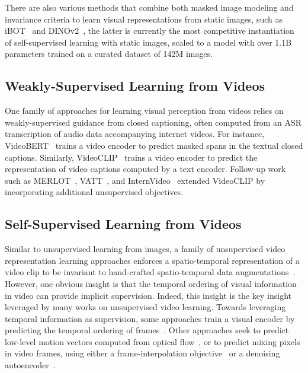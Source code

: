 \documentclass[twocolumn]{fairmeta}
\theoremstyle{plain}
\theoremstyle{definition}
\theoremstyle{remark}
\begin{document}
There are also various methods that combine both masked image modeling and invariance criteria to learn visual representations from static images, such as iBOT~\citep{zhou2021ibotyes} and DINOv2~\citep{zhou2021ibotyes, oquab2023dinov2}, the latter is currently the most competitive instantiation of self-supervised learning with static images, scaled to a model with over 1.1B parameters trained on a curated dataset of 142M images.

\subsection*{Weakly-Supervised Learning from Videos}
One family of approaches for learning visual perception from videos relies on weakly-supervised guidance from closed captioning, often computed from an ASR transcription of audio data accompanying internet videos.
For instance, VideoBERT~\citep{sun2019videobert,xu2021videoclip} trains a video encoder to predict masked spans in the textual closed captions.
Similarly, VideoCLIP~\citep{xu2021videoclip} trains a video encoder to predict the representation of video captions computed by a text encoder.
Follow-up work such as MERLOT~\citep{zellers2022merlot}, VATT~\citep{akbari2021vatt}, and InternVideo~\citep{wang2022internvideo} extended VideoCLIP by incorporating additional unsupervised objectives.

\subsection*{Self-Supervised Learning from Videos}
Similar to unsupervised learning from images, a family of unsupervised video representation learning approaches enforces a spatio-temporal representation of a video clip to be invariant to hand-crafted spatio-temporal data augmentations~\citep{parthasarathy2022self}.
However, one obvious insight is that the temporal ordering of visual information in video can provide implicit supervision.
Indeed, this insight is the key insight leveraged by many works on unsupervised video learning.
Towards leveraging temporal information as supervision, some approaches train a visual encoder by predicting the temporal ordering of frames~\citep{xu2019self, lee2017unsupervised}.
Other approaches seek to predict low-level motion vectors computed from optical flow~\citep{pintea2014deja}, or to predict mixing pixels in video frames, using either a frame-interpolation objective~\citep{kalluri2023flavr} or a denoising autoencoder~\citep{tong2022videomae, feichtenhofer2022masked, wang2023videomae}.
\end{document}
